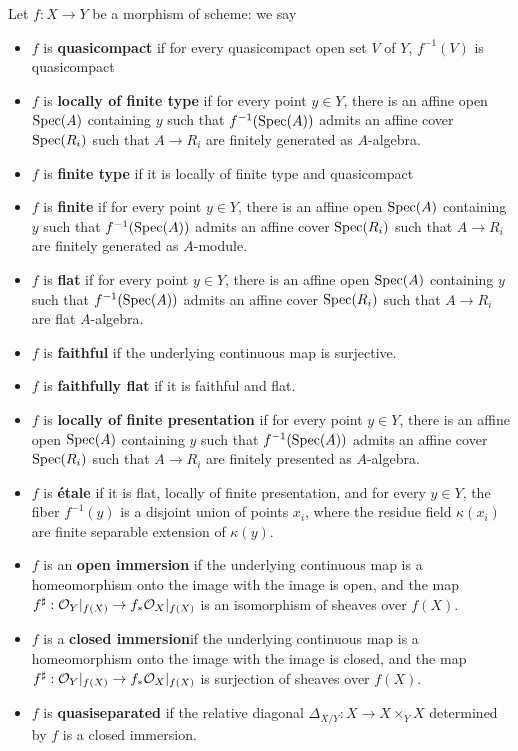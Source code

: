 \begin{definition}
    Let $f:X\to Y$ be a morphism of scheme: we say 
    \begin{itemize}
        \item $f$ is \textbf{quasicompact} if for every quasicompact open set $V$ of $Y$, $f^{-1}(V)$ is quasicompact
        \item $f$ is \textbf{locally of finite type} if for every point $y \in Y$, there is an affine open $\operatorname{\mathrm{Spec}}(A)$ containing $y$ such that $f^{-1}(\operatorname{\mathrm{Spec}}(A))$ admits an affine cover $\operatorname{\mathrm{Spec}}(R_i)$ such that $A\to R_i$ are finitely generated as $A$-algebra.
        \item $f$ is \textbf{finite type} if it is locally of finite type and quasicompact
        \item $f$ is \textbf{finite} if for every point $y \in Y$, there is an affine open $\operatorname{\mathrm{Spec}}(A)$ containing $y$ such that $f^{-1}(\operatorname{\mathrm{Spec}}(A))$ admits an affine cover $\operatorname{\mathrm{Spec}}(R_i)$ such that $A\to R_i$ are finitely generated as $A$-module.
        \item $f$ is \textbf{flat} if for every point $y \in Y$, there is an affine open $\operatorname{\mathrm{Spec}}(A)$ containing $y$ such that $f^{-1}(\operatorname{\mathrm{Spec}}(A))$ admits an affine cover $\operatorname{\mathrm{Spec}}(R_i)$ such that $A\to R_i$ are flat $A$-algebra.
        \item $f$ is \textbf{faithful} if the underlying continuous map is surjective.
        \item $f$ is \textbf{faithfully flat} if it is faithful and flat.
        \item $f$ is \textbf{locally of finite presentation} if for every point $y \in Y$, there is an affine open $\operatorname{\mathrm{Spec}}(A)$ containing $y$ such that $f^{-1}(\operatorname{\mathrm{Spec}}(A))$ admits an affine cover $\operatorname{\mathrm{Spec}}(R_i)$ such that $A\to R_i$ are finitely presented as $A$-algebra.
        \item $f$ is \textbf{étale} if it is flat, locally of finite presentation, and for every $y\in Y$, the fiber $f^{-1}(y)$ is a disjoint union of points $x_i$, where the residue field $\kappa(x_i)$ are finite separable extension of $\kappa(y)$.
        \item $f$ is an \textbf{open immersion} if the underlying continuous map is a homeomorphism onto the image with the image is open, and the map $f^{\operatorname{\sharp}}: \mathcal{O}_{Y}|_{f(X)}\to f_*\mathcal{O}_{X}|_{f(X)}$ is an isomorphism of sheaves over $f(X)$.
        \item $f$ is a \textbf{closed immersion}if the underlying continuous map is a homeomorphism onto the image with the image is closed, and the map $f^{\operatorname{\sharp}}: \mathcal{O}_{Y}|_{f(X)}\to f_*\mathcal{O}_{X}|_{f(X)}$ is  surjection of sheaves over $f(X)$.
        \item $f$ is \textbf{quasiseparated} if the relative diagonal $\Delta_{X/Y}:X\to X\times _Y X$ determined by $f$ is a closed immersion.
    \end{itemize}
\end{definition}

